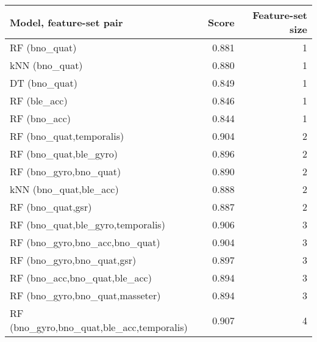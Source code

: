 \begin{table}[h!]
\begin{tabular}{lrr}
\toprule
                                                 Model, feature-set pair &  Score &  Feature-set size \\
\midrule
                                                           RF (bno\_quat) &  0.881 &                 1 \\
                                                          kNN (bno\_quat) &  0.880 &                 1 \\
                                                           DT (bno\_quat) &  0.849 &                 1 \\
                                                            RF (ble\_acc) &  0.846 &                 1 \\
                                                            RF (bno\_acc) &  0.844 &                 1 \\
                                                RF (bno\_quat,temporalis) &  0.904 &                 2 \\
                                                  RF (bno\_quat,ble\_gyro) &  0.896 &                 2 \\
                                                  RF (bno\_gyro,bno\_quat) &  0.890 &                 2 \\
                                                  kNN (bno\_quat,ble\_acc) &  0.888 &                 2 \\
                                                       RF (bno\_quat,gsr) &  0.887 &                 2 \\
                                       RF (bno\_quat,ble\_gyro,temporalis) &  0.906 &                 3 \\
                                          RF (bno\_gyro,bno\_acc,bno\_quat) &  0.904 &                 3 \\
                                              RF (bno\_gyro,bno\_quat,gsr) &  0.897 &                 3 \\
                                           RF (bno\_acc,bno\_quat,ble\_acc) &  0.894 &                 3 \\
                                         RF (bno\_gyro,bno\_quat,masseter) &  0.894 &                 3 \\
                               RF (bno\_gyro,bno\_quat,ble\_acc,temporalis) &  0.907 &                 4 \\

\end{tabular}
\end{table}
